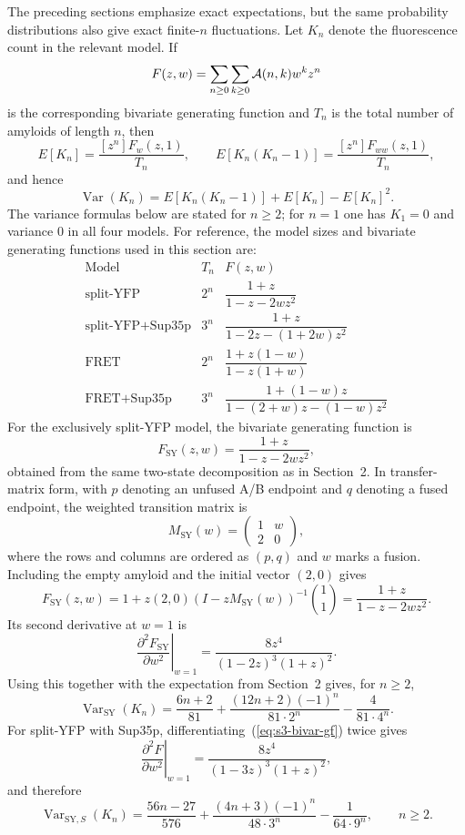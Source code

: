 \documentclass[11pt]{article}
\newcommand{\cA}{ {\cal A} }
\begin{document}
The preceding sections emphasize exact expectations, but the same probability distributions also give exact finite-$n$ fluctuations. Let $K_n$ denote the fluorescence count in the relevant model. If
\[
F(z,w) = \sum_{n \ge 0} \sum_{k \ge 0} \cA(n,k) w^k z^n
\]
is the corresponding bivariate generating function and $T_n$ is the total number of amyloids of length $n$, then
\[
E[K_n] = \frac{[z^n]F_w(z,1)}{T_n}, \qquad
E[K_n(K_n-1)] = \frac{[z^n]F_{ww}(z,1)}{T_n},
\]
and hence
\[
\operatorname{Var}(K_n) = E[K_n(K_n-1)] + E[K_n] - E[K_n]^2.
\]
The variance formulas below are stated for $n \ge 2$; for $n=1$ one has $K_1=0$ and variance $0$ in all four models. For reference, the model sizes and bivariate generating functions used in this section are:
\[
\begin{array}{c|c|c}
\text{Model} & T_n & F(z,w) \\
\hline
\text{split-YFP} & 2^n & \dfrac{1+z}{1-z-2wz^2} \\[8pt]
\text{split-YFP+Sup35p} & 3^n & \dfrac{1+z}{1-2z-(1+2w)z^2} \\[8pt]
\text{FRET} & 2^n & \dfrac{1+z(1-w)}{1-z(1+w)} \\[8pt]
\text{FRET+Sup35p} & 3^n & \dfrac{1+(1-w)z}{1-(2+w)z-(1-w)z^2}
\end{array}
\]
For the exclusively split-YFP model, the bivariate generating function is
\[
F_{\text{SY}}(z,w) = \frac{1+z}{1-z-2wz^2},
\]
obtained from the same two-state decomposition as in Section~2. In transfer-matrix form, with $p$ denoting an unfused A/B endpoint and $q$ denoting a fused endpoint, the weighted transition matrix is
\[
M_{\text{SY}}(w)=
\begin{pmatrix}
1 & w\\
2 & 0
\end{pmatrix},
\]
where the rows and columns are ordered as $(p,q)$ and $w$ marks a fusion. Including the empty amyloid and the initial vector $(2,0)$ gives
\[
F_{\text{SY}}(z,w)=1+z(2,0)\left(I-zM_{\text{SY}}(w)\right)^{-1}\binom{1}{1}
=\frac{1+z}{1-z-2wz^2}.
\]
Its second derivative at $w=1$ is
\[
\left. \frac{\partial^2 F_{\text{SY}}}{\partial w^2} \right|_{w=1}
= \frac{8z^4}{(1-2z)^3(1+z)^2}.
\]
Using this together with the expectation from Section~2 gives, for $n \ge 2$,
\[
\operatorname{Var}_{\text{SY}}(K_n)
=
\frac{6n+2}{81}
+
\frac{(12n+2)(-1)^n}{81\cdot 2^n}
-
\frac{4}{81\cdot 4^n}.
\]
For split-YFP with Sup35p, differentiating~(\ref{eq:s3-bivar-gf}) twice gives
\[
\left. \frac{\partial^2 F}{\partial w^2} \right|_{w=1}
= \frac{8z^4}{(1-3z)^3(1+z)^2},
\]
and therefore
\[
\operatorname{Var}_{\text{SY},S}(K_n)
=
\frac{56n-27}{576}
+
\frac{(4n+3)(-1)^n}{48\cdot 3^n}
-
\frac{1}{64\cdot 9^n},
\qquad n \ge 2.
\]
\end{document}

